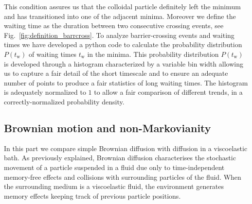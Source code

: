 This condition assures us that the colloidal particle definitely left the minimum and has transitioned into one of the adjacent minima. Moreover we define the waiting time as the duration between two consecutive crossing events, see Fig.~\ref{fig:definition_barrcross}.
To analyze barrier-crossing events and waiting times we have developed a python code to calculate the probability distribution $P(t_\text{w})$ of waiting times $t_\text{w}$ in the minima. This probability distribution $P(t_\text{w})$ is developed through a histogram characterized by a variable bin width allowing us to capture a fair detail of the short timescale and to ensure an adequate number of points to produce a fair statistics of long waiting times. The histogram is adequately normalized to $1$ to allow a fair comparison of different trends, in a correctly-normalized probability density.
\subsection{Brownian motion and non-Markovianity}\label{sec_markov_vs_non}
In this part we compare simple Brownian diffusion with diffusion in a viscoelastic bath. As previously explained, Brownian diffusion characterises the stochastic movement of a particle suspended in a fluid due only to time-independent memory-free effects and collisions with surrounding particles of the fluid. When the surrounding medium is a viscoelastic fluid, the environment generates memory effects keeping track of previous particle positions.

